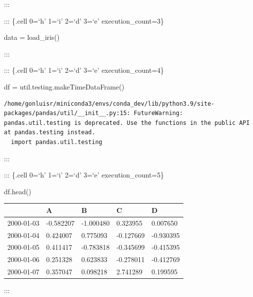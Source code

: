 \documentclass[
  letterpaper,
  DIV=11,
  numbers=noendperiod]{scrreport}
\newenvironment{Shaded}{\begin{snugshade}}{\end{snugshade}}
\newcommand{\NormalTok}[1]{\textcolor[rgb]{0.00,0.23,0.31}{#1}}
\newcommand{\OperatorTok}[1]{\textcolor[rgb]{0.37,0.37,0.37}{#1}}
\begin{document}
:::

::: \{.cell 0=`h' 1=`i' 2=`d' 3=`e' execution\_count=3\}

\begin{Shaded}
\begin{Highlighting}[]
\NormalTok{data }\OperatorTok{=}\NormalTok{ load\_iris()}
\end{Highlighting}
\end{Shaded}

:::

::: \{.cell 0=`h' 1=`i' 2=`d' 3=`e' execution\_count=4\}

\begin{Shaded}
\begin{Highlighting}[]
\NormalTok{df }\OperatorTok{=}\NormalTok{ util.testing.makeTimeDataFrame()}
\end{Highlighting}
\end{Shaded}

\begin{verbatim}
/home/gonluisr/miniconda3/envs/conda_dev/lib/python3.9/site-packages/pandas/util/__init__.py:15: FutureWarning: pandas.util.testing is deprecated. Use the functions in the public API at pandas.testing instead.
  import pandas.util.testing
\end{verbatim}

:::

::: \{.cell 0=`h' 1=`i' 2=`d' 3=`e' execution\_count=5\}

\begin{Shaded}
\begin{Highlighting}[]
\NormalTok{df.head()}
\end{Highlighting}
\end{Shaded}

\begin{longtable}[]{@{}lllll@{}}
\toprule()
& A & B & C & D \\
\midrule()
\endhead
2000-01-03 & -0.582207 & -1.000480 & 0.323955 & 0.007650 \\
2000-01-04 & 0.424007 & 0.775093 & -0.127669 & -0.930395 \\
2000-01-05 & 0.411417 & -0.783818 & -0.345699 & -0.415395 \\
2000-01-06 & 0.251328 & 0.623833 & -0.278011 & -0.412769 \\
2000-01-07 & 0.357047 & 0.098218 & 2.741289 & 0.199595 \\
\bottomrule()
\end{longtable}

:::
\end{document}
